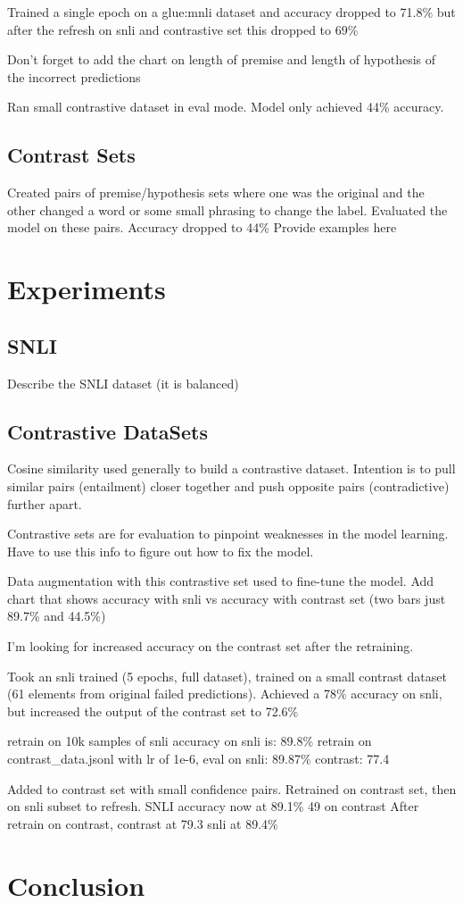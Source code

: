 \documentclass[11pt]{article}
\begin{document}
Trained a single epoch on a glue:mnli dataset and accuracy dropped to 71.8\%  but after the refresh on snli and contrastive set this dropped to 69\%

Don't forget to add the chart on length of premise and length of hypothesis of the incorrect predictions

Ran small contrastive dataset in eval mode. Model only achieved 44\% accuracy.

\subsection{Contrast Sets}
Created pairs of premise/hypothesis sets where one was the original and the other changed a word or some small phrasing to change the label. Evaluated the model on these pairs. Accuracy dropped to 44\%  Provide examples here

\section{Experiments}
\subsection{SNLI}

Describe the SNLI dataset (it is balanced) \citealp{dataAug}
\subsection{Contrastive DataSets}

Cosine similarity used generally to build a contrastive dataset. Intention is to pull similar pairs (entailment) closer together and push opposite pairs (contradictive) further apart.

Contrastive sets are for evaluation to pinpoint weaknesses in the model learning. Have to use this info to figure out how to fix the model.

Data augmentation with this contrastive set used to fine-tune the model.
Add chart that shows accuracy with snli vs accuracy with contrast set (two bars just 89.7\% and 44.5\%)

I'm looking for increased accuracy on the contrast set after the retraining.

Took an snli trained (5 epochs, full dataset), trained on a small contrast dataset (61 elements from original failed predictions).  Achieved a 78\% accuracy on snli, but increased the output of the contrast set to 72.6\%

retrain on 10k samples of snli accuracy on snli is: 89.8\%
retrain on contrast\_data.jsonl with lr of 1e-6, eval on snli: 89.87\%  contrast: 77.4

Added to contrast set with small confidence pairs. Retrained on contrast set, then on snli subset to refresh. SNLI accuracy now at 89.1\% 49 on contrast
After retrain on contrast, contrast at 79.3 snli at 89.4\%

\section{Conclusion}



\end{document}
